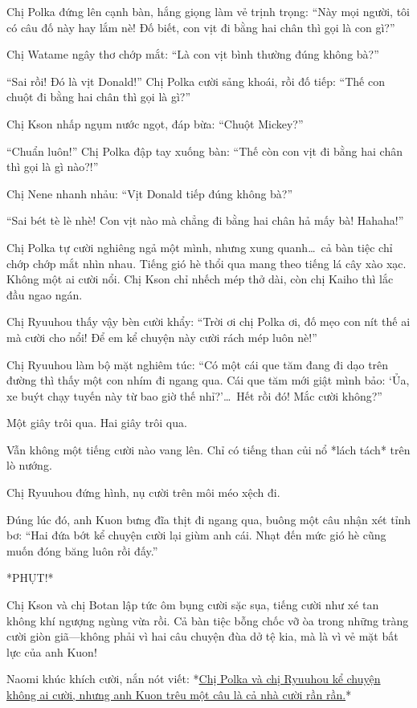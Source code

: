 \documentclass[../main.tex]{subfiles}
\begin{document}
Chị Polka đứng lên cạnh bàn, hắng giọng làm vẻ trịnh trọng: ``Này mọi người, tôi có câu đố này hay lắm nè! Đố biết, con vịt đi bằng hai chân thì gọi là con gì?''

Chị Watame ngây thơ chớp mắt: ``Là con vịt bình thường đúng không bà?''

``Sai rồi! Đó là vịt Donald!'' Chị Polka cười sảng khoái, rồi đố tiếp: ``Thế con chuột đi bằng hai chân thì gọi là gì?''

Chị Kson nhấp ngụm nước ngọt, đáp bừa: ``Chuột Mickey?''

``Chuẩn luôn!'' Chị Polka đập tay xuống bàn: ``Thế còn con vịt đi bằng hai chân thì gọi là gì nào?!''

Chị Nene nhanh nhảu: ``Vịt Donald tiếp đúng không bà?''

``Sai bét tè lè nhè! Con vịt nào mà chẳng đi bằng hai chân hả mấy bà! Hahaha!''

Chị Polka tự cười nghiêng ngả một mình, nhưng xung quanh\dots\ cả bàn tiệc chỉ chớp chớp mắt nhìn nhau. Tiếng gió hè thổi qua mang theo tiếng lá cây xào xạc. Không một ai cười nổi. Chị Kson chỉ nhếch mép thở dài, còn chị Kaiho thì lắc đầu ngao ngán.

Chị Ryuuhou thấy vậy bèn cười khẩy: ``Trời ơi chị Polka ơi, đố mẹo con nít thế ai mà cười cho nổi! Để em kể chuyện này cười rách mép luôn nè!''

Chị Ryuuhou làm bộ mặt nghiêm túc: ``Có một cái que tăm đang đi dạo trên đường thì thấy một con nhím đi ngang qua. Cái que tăm mới giật mình bảo: `Ủa, xe buýt chạy tuyến này từ bao giờ thế nhỉ?'\dots\ Hết rồi đó! Mắc cười không?''

Một giây trôi qua. Hai giây trôi qua.

Vẫn không một tiếng cười nào vang lên. Chỉ có tiếng than củi nổ *lách tách* trên lò nướng.

Chị Ryuuhou đứng hình, nụ cười trên môi méo xệch đi.

Đúng lúc đó, anh Kuon bưng đĩa thịt đi ngang qua, buông một câu nhận xét tỉnh bơ: ``Hai đứa bớt kể chuyện cười lại giùm anh cái. Nhạt đến mức gió hè cũng muốn đóng băng luôn rồi đấy.''

*PHỤT!*

Chị Kson và chị Botan lập tức ôm bụng cười sặc sụa, tiếng cười như xé tan không khí ngượng ngùng vừa rồi. Cả bàn tiệc bỗng chốc vỡ òa trong những tràng cười giòn giã—không phải vì hai câu chuyện đùa dở tệ kia, mà là vì vẻ mặt bất lực của anh Kuon!

Naomi khúc khích cười, nắn nót viết: *\uline{Chị Polka và chị Ryuuhou kể chuyện không ai cười, nhưng anh Kuon trêu một câu là cả nhà cười rần rần.}*
\end{document}
